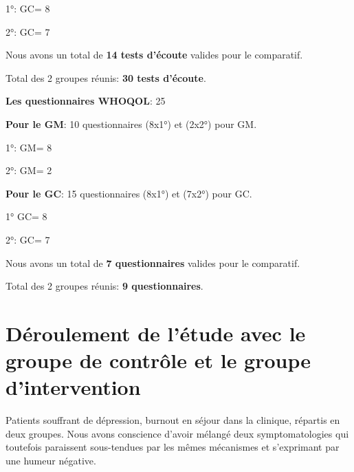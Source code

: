      1°: GC= 8

     2°: GC= 7
     
     Nous avons un total de \textbf{14 tests d'écoute} valides pour le
     comparatif.

     
Total des 2 groupes réunis:\textbf{ 30 tests d'écoute}.
     


\textbf{Les questionnaires WHOQOL}: 25

     \textbf{Pour le GM}:      
     10 questionnaires (8x1°) et (2x2°) pour GM.
     
     1°: GM= 8 

     
     2°: GM= 2
   
     
\textbf{ Pour le GC}:
15 questionnaires (8x1°) et (7x2°) pour GC.
    
     1° GC= 8
     
     2°: GC= 7
     
     Nous avons un total de \textbf{7 questionnaires} valides pour le
     comparatif.
     
Total des 2 groupes réunis: \textbf{9 questionnaires}.
    
 
          
 
 
 	
 	
       

 	
 	\section{Déroulement de l'étude avec le groupe
          de contrôle et le groupe d'intervention}





                                      Patients souffrant de dépression, burnout
                                               en séjour dans la
                                               clinique, répartis en
                                               deux groupes.
                                               Nous avons conscience
                                               d'avoir mélangé deux
                                               symptomatologies qui
                                               toutefois paraissent
                                               sous-tendues par les
                                               mêmes mécanismes et
                                               s'exprimant par une
                                               humeur négative.

